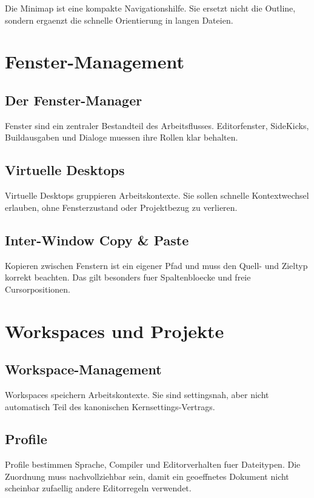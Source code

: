 \documentclass[a4paper,11pt]{report}
\begin{document}
Die Minimap ist eine kompakte Navigationshilfe. Sie ersetzt nicht die Outline,
sondern ergaenzt die schnelle Orientierung in langen Dateien.

\chapter{Fenster-Management}

\section{Der Fenster-Manager}

Fenster sind ein zentraler Bestandteil des Arbeitsflusses. Editorfenster,
SideKicks, Buildausgaben und Dialoge muessen ihre Rollen klar behalten.

\section{Virtuelle Desktops}

Virtuelle Desktops gruppieren Arbeitskontexte. Sie sollen schnelle
Kontextwechsel erlauben, ohne Fensterzustand oder Projektbezug zu verlieren.

\section{Inter-Window Copy \& Paste}

Kopieren zwischen Fenstern ist ein eigener Pfad und muss den Quell- und Zieltyp
korrekt beachten. Das gilt besonders fuer Spaltenbloecke und freie
Cursorpositionen.

\chapter{Workspaces und Projekte}

\section{Workspace-Management}

Workspaces speichern Arbeitskontexte. Sie sind settingsnah, aber nicht
automatisch Teil des kanonischen Kernsettings-Vertrags.

\section{Profile}

Profile bestimmen Sprache, Compiler und Editorverhalten fuer Dateitypen.
Die Zuordnung muss nachvollziehbar sein, damit ein geoeffnetes Dokument nicht
scheinbar zufaellig andere Editorregeln verwendet.
\end{document}
